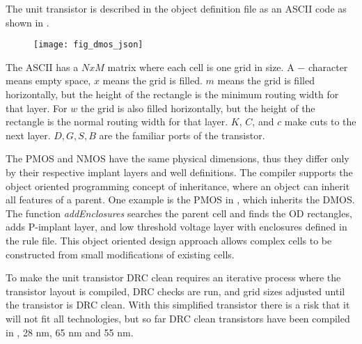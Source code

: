 The unit transistor is described in the object definition file as an ASCII code as shown in
.
\begin{figure}[t]
\centering
\centerline{\texttt{[image: fig\_dmos\_json]}}
\caption{}
\label{fig_dmos_json}
\end{figure}
The ASCII has a $ N x M $ matrix where each cell
is one grid in size. A $-$ character means empty space, $x$
means the grid is filled. $m$ means the grid is filled horizontally,
but the height of the rectangle is the minimum routing width for that
layer. For $w$ the grid is also filled horizontally, but the height
of the rectangle is the normal routing width for that layer. $K$, $C$,
and $c$ make cuts to the next layer. $D,G,S,B$ are the
familiar ports of the transistor.

The PMOS and NMOS have the same physical dimensions, thus they
differ only by their respective implant layers and well definitions. The
compiler supports the object oriented programming concept of
inheritance, where an object can inherit all features of a
parent. One example is the PMOS in , which inherits the
DMOS. The function \textit{addEnclosures} searches the parent
cell and finds the OD rectangles, adds P-implant layer, and low threshold
voltage layer with enclosures defined in the rule file.  This object
oriented design approach allows complex cells to be constructed
from small modifications of existing cells.

To make the unit transistor DRC clean requires an
iterative process where the transistor layout is compiled, DRC checks
are run, and grid sizes adjusted until the transistor is DRC
clean. With this simplified transistor there is a risk that it will
not fit all technologies, but so far DRC clean transistors have been
compiled in {\technm}, 28 nm, 65 nm and 55 nm.



